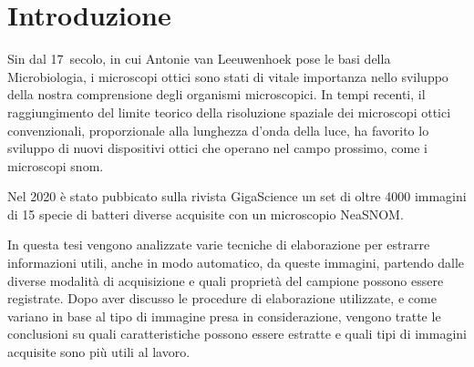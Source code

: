 \documentclass[../main.tex]{subfiles}
\begin{document}
\chapter*{Introduzione}
Sin dal 17\textdegree\ secolo, in cui Antonie van Leeuwenhoek pose le basi della Microbiologia\cite{lane_2015, dobell_1923, corliss_1975}, i microscopi ottici sono stati di vitale importanza nello sviluppo della nostra comprensione degli organismi microscopici.
In tempi recenti, il raggiungimento del limite teorico della risoluzione spaziale dei microscopi ottici convenzionali, proporzionale alla lunghezza d'onda della luce, ha favorito lo sviluppo di nuovi dispositivi ottici che operano nel campo prossimo, come i microscopi \gls{snom}\cite{ohtsu_2020}.

Nel 2020 è stato pubbicato sulla rivista GigaScience un set di oltre 4000 immagini di 15 specie di batteri diverse acquisite con un microscopio NeaSNOM\cite{ssnombacter}.

In questa tesi vengono analizzate varie tecniche di elaborazione per estrarre informazioni utili, anche in modo automatico, da queste immagini, partendo dalle diverse modalità di acquisizione e quali proprietà del campione possono essere registrate.
Dopo aver discusso le procedure di elaborazione utilizzate, e come variano in base al tipo di immagine presa in considerazione, vengono tratte le conclusioni su quali caratteristiche possono essere estratte e quali tipi di immagini acquisite sono più utili al lavoro.
\end{document}
